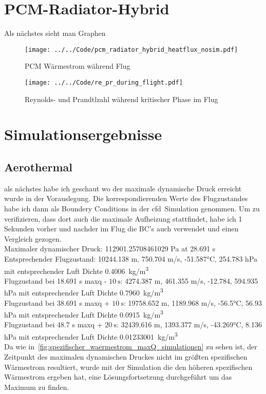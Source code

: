 \section{PCM-Radiator-Hybrid}\label{sec:pcmRadiatorHybridErgebnisse}

Als nächstes sieht man Graphen

\begin{figure}[H]
  \centering
  \texttt{[image: ../../Code/pcm\_radiator\_hybrid\_heatflux\_nosim.pdf]}\label{fig:pcm_waermestrom_vorauslegung}
  \caption{PCM Wärmestrom während Flug}
  \texttt{[image: ../../Code/re\_pr\_during\_flight.pdf]}\label{fig:re_pr_flugsimulation}
  \caption{Reynolds- und Prandtlzahl während kritischer Phase im Flug}
\end{figure}

\section{Simulationsergebnisse}

\subsection{Aerothermal}

als nächstes habe ich geschaut wo der maximale dynamische Druck erreicht wurde in der Vorauslegung. Die korrespondierenden Werte des Flugzustandes
habe ich dann als Boundery Conditions in der \ac{cfd}~Simulation genommen.
Um zu verifizieren, dass dort auch die maximale Aufheizung stattfindet, habe ich 1 Sekunden vorher und nachder
im Flug die BC's auch verwendet und einen Vergleich gezogen.\\
Maximaler dynamischer Druck: 112901.25708461029 Pa at 28.691 s\\
Entsprechender Flugzustand: 10244.138 m, 750.704 m/s, -51.587°C, 254.783 hPa mit entsprechender Luft Dichte \SI{0.4006}{kg/m^3}\\
Flugzustand bei 18.691 s \ac{maxq} - $\SI{10}{\second}$: 4274.387 m, 461.355 m/s, -12.784, 594.935 hPa mit entsprechender Luft Dichte \SI{0.7960}{kg/m^3}\\
Flugzustand bei 38.691 s \ac{maxq} + $\SI{10}{\second}$: 19758.652 m, 1189.968 m/s, -56.5°C, 56.93 hPa mit entsprechender Luft Dichte \SI{0.0915}{kg/m^3}\\
Flugzustand bei 48.7 s \ac{maxq} + $\SI{20}{\second}$: 32439.616 m, 1393.377 m/s, -43.269°C, 8.136 hPa mit entsprechender Luft Dichte \SI{0.01233001}{kg/m^3}\\
Da wie in~\ref{fig:spezifischer_waermestrom_maxQ_simulationen} zu sehen ist, der Zeitpunkt des maximalen dynamischen Druckes nicht im größten spezifischen
Wärmestrom resultiert, wurde mit der Simulation die den höheren spezifischen Wärmestrom ergeben hat, eine Lösungsfortsetzung durchgeführt um das Maximum zu finden.\\

